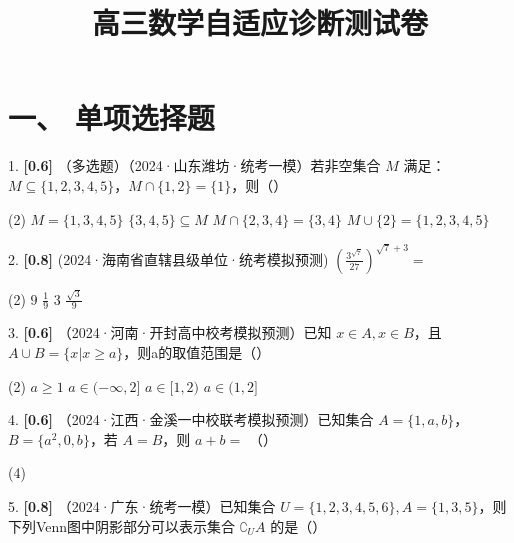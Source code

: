 \documentclass[11pt,a4paper]{article}
\title{\vspace{-2cm}\textbf{高三数学自适应诊断测试卷}}
\date{}
\begin{document}
\maketitle
\vspace{-1cm}
\section*{一、 单项选择题}
1. \textbf{[0.6]} （多选题）（2024·山东潍坊·统考一模）若非空集合 $M$ 满足：$M \subseteq \{1,2,3,4,5\}$，$M \cap \{1,2\}=\{1\}$，则（\quad）

\begin{tasks}(2)
    \task $M=\{1,3,4,5\}$
    \task $\{3,4,5\} \subseteq M$
    \task $M \cap \{2,3,4\}=\{3,4\}$
    \task $M \cup \{2\}=\{1,2,3,4,5\}$
\end{tasks}

\vspace{2.5cm}

2. \textbf{[0.8]} (2024·海南省直辖县级单位·统考模拟预测) $\left(\frac{3^{\sqrt{7}}}{27}\right)^{\sqrt{7}+3}=$

\begin{tasks}(2)
    \task $9$
    \task $\frac{1}{9}$
    \task $3$
    \task $\frac{\sqrt{3}}{9}$
\end{tasks}

\vspace{2.5cm}

3. \textbf{[0.6]} （2024·河南·开封高中校考模拟预测）已知 $x \in A, x \in B$，且 $A \cup B=\{x|x \geq a\}$，则a的取值范围是（\quad）

\begin{tasks}(2)
    \task $a \geq 1$
    \task $a \in (-\infty, 2]$
    \task $a \in [1, 2)$
    \task $a \in (1,2]$
\end{tasks}

\vspace{2.5cm}

4. \textbf{[0.6]} （2024·江西·金溪一中校联考模拟预测）已知集合 $A=\{1,a,b\}$，$B=\{a^2,0,b\}$，若 $A=B$，则 $a+b=$ （\quad）

\begin{tasks}(4)
\end{tasks}

\vspace{2.5cm}

5. \textbf{[0.8]} （2024·广东·统考一模）已知集合 $U=\{1,2,3,4,5,6\}, A=\{1,3,5\}$，则下列Venn图中阴影部分可以表示集合 $\complement_U A$ 的是（\quad）
\end{document}
